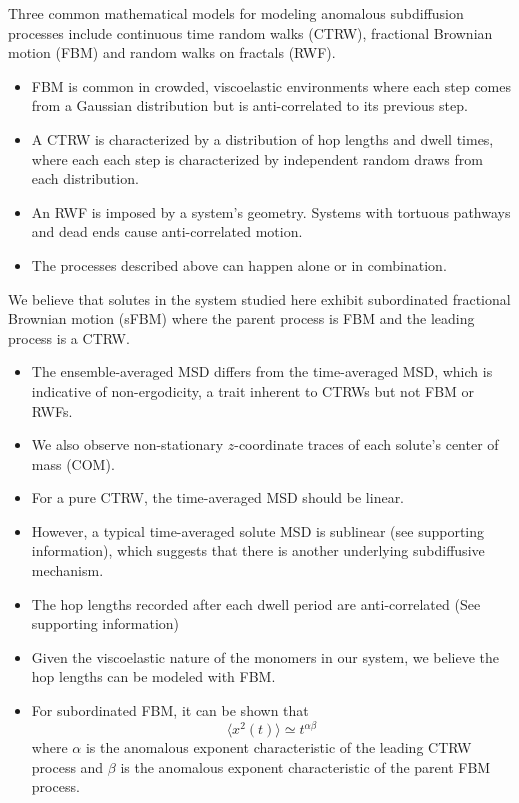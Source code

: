 \documentclass{article}
\begin{document}
  \noindent Three common mathematical models for modeling anomalous subdiffusion
  processes include continuous time random walks (CTRW), fractional Brownian motion
  (FBM) and random walks on fractals (RWF).\cite{meroz_toolbox_2015}
  \begin{itemize}
    \item FBM is common in crowded, viscoelastic environments where each step comes 
    from a Gaussian distribution but is anti-correlated to its previous 
    step.~\cite{mandelbrot_fractional_1968,jeon_fractional_2010,banks_anomalous_2005}
    \item A CTRW is characterized by a distribution of hop lengths and 
    dwell times, where each each step is characterized by independent random draws from 
    each distribution.\cite{montroll_random_1965,morrin_three_2018}
    \item An RWF is imposed by a system's geometry. Systems with tortuous pathways and dead
    ends cause anti-correlated motion.\cite{meroz_toolbox_2015,neusius_subdiffusion_2008}
    \item The processes described above can happen alone or in combination.  	
  \end{itemize}
  
  \noindent We believe that solutes in the system studied here exhibit subordinated 
  fractional Brownian motion (sFBM) where the parent process is FBM and the 
  leading process is a CTRW. 
  \begin{itemize}
  	\item The ensemble-averaged MSD differs from the time-averaged MSD, which
  	is indicative of non-ergodicity, a trait inherent to CTRWs but not FBM or RWFs.~\cite{thiel_weak_2014}
  	\item We also observe non-stationary $z$-coordinate traces of each solute's
  	center of mass (COM). %
  	\item For a pure CTRW, the time-averaged MSD should be linear.
  	~\cite{neusius_subdiffusion_2008,meroz_subdiffusion_2010}
  	\item However, a typical time-averaged solute MSD is sublinear (see supporting
  	information), which suggests that there is another underlying subdiffusive mechanism.
  	\item The hop lengths recorded after each dwell period are anti-correlated (See supporting information)
  	\item Given the viscoelastic nature of the monomers in our system, we believe
  	the hop lengths can be modeled with FBM. 
 	\item For subordinated FBM, it can be shown that
  	\begin{equation}
  	\langle x^2(t) \rangle \simeq t^{\alpha\beta}
  	\end{equation}
  	where $\alpha$ is the anomalous exponent characteristic of the leading CTRW process
  	and $\beta$ is the anomalous exponent characteristic of the parent FBM process. 
  \end{itemize}
\end{document}
